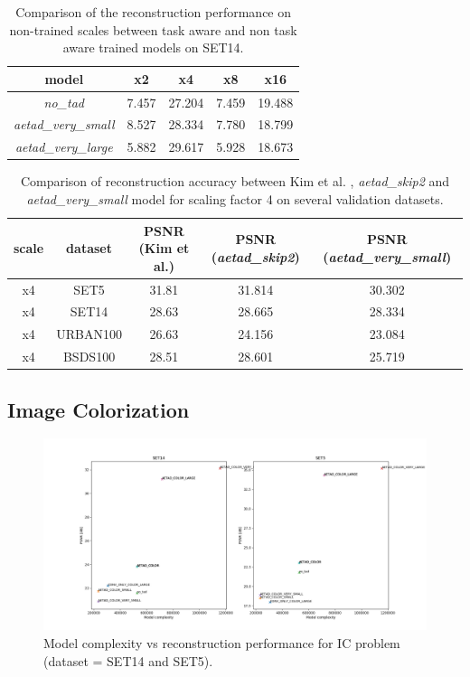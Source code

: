 \begin{table}[!htbp]
	\begin{center}
	\begin{tabular}{c|c|c|c|c}
	model & x2 & x4 & x8 & x16 \\
	\hline
  \textit{no\_tad} & 7.457 & 27.204 & 7.459 & 19.488 \\
	\textit{aetad\_very\_small} & 8.527 & 28.334 & 7.780 & 18.799 \\
	\textit{aetad\_very\_large} & 5.882 & 29.617 & 5.928 & 18.673 \\
	\end{tabular}
	\caption{Comparison of the reconstruction performance on non-trained scales
	between task aware and non task aware trained models on SET14.}
	\label{table:sisrotherscales}
	\end{center}
\end{table}


\begin{table}[!htbp]
	\begin{center}
	\begin{tabular}{c|c|c|c|c}
	scale & dataset & PSNR (Kim et al.) & PSNR (\textit{aetad\_skip2})
	& PSNR (\textit{aetad\_very\_small}) \\
	\hline
  x4 & SET5 & 31.81 & 31.814 & 30.302 \\
	x4 & SET14 & 28.63 & 28.665 & 28.334 \\
	x4 & URBAN100 & 26.63 & 24.156 & 23.084 \\
	x4 & BSDS100 & 28.51 & 28.601 & 25.719 \\
	\end{tabular}
	\caption{Comparison of reconstruction accuracy between Kim et al. \cite{TAID},
	\textit{aetad\_skip2} and \textit{aetad\_very\_small}
	model for scaling factor 4 on several validation datasets. }
	\label{table:sisperformance}
	\end{center}
\end{table}

\subsection{Image Colorization}
\label{sec:Experiments_IC}


\begin{figure}[!htbp]
	\centering
	\includegraphics[width=18cm]{figures/psnr_complexity_ic}
	\caption{Model complexity vs reconstruction performance for \ac{IC}
	problem (dataset = SET14 and SET5).}
  \label{fig:psnr_complexity_ic}
\end{figure}

